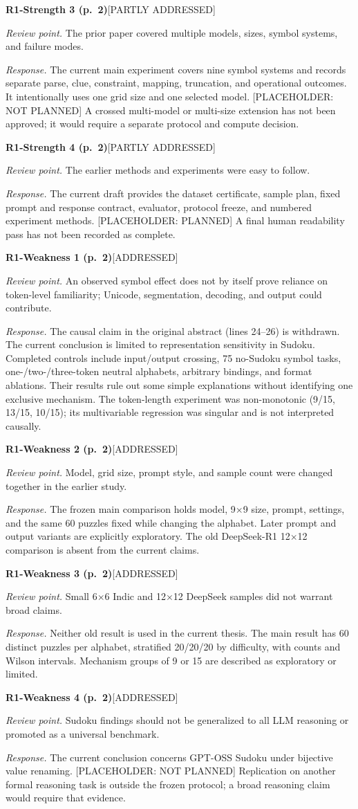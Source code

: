 \documentclass[10pt,a4paper]{article}
\newcommand{\Done}{\textcolor{done}{\textsf{[ADDRESSED]}}}
\newcommand{\Partial}{\textcolor{pending}{\textsf{[PARTLY ADDRESSED]}}}
\newcommand{\Planned}{\textcolor{pending}{\textsf{[PLACEHOLDER: PLANNED]}}}
\newcommand{\Open}{\textcolor{open}{\textsf{[PLACEHOLDER: NOT PLANNED]}}}
\newcommand{\itemresponse}[4]{%
  \Needspace{5\baselineskip}%
  \par\vspace{0.65\baselineskip}%
  \noindent\textbf{#1}\quad #2\par
  \noindent\emph{Review point.} #3\par
  \noindent\emph{Response.} #4\par
}
\begin{document}
\itemresponse{R1-Strength 3 (p.~2)}{\Partial}{The prior paper covered multiple models, sizes, symbol systems, and failure modes.}{The current main experiment covers nine symbol systems and records separate parse, clue, constraint, mapping, truncation, and operational outcomes. It intentionally uses one grid size and one selected model. \Open{} A crossed multi-model or multi-size extension has not been approved; it would require a separate protocol and compute decision.}

\itemresponse{R1-Strength 4 (p.~2)}{\Partial}{The earlier methods and experiments were easy to follow.}{The current draft provides the dataset certificate, sample plan, fixed prompt and response contract, evaluator, protocol freeze, and numbered experiment methods. \Planned{} A final human readability pass has not been recorded as complete.}

\itemresponse{R1-Weakness 1 (p.~2)}{\Done}{An observed symbol effect does not by itself prove reliance on token-level familiarity; Unicode, segmentation, decoding, and output could contribute.}{The causal claim in the original abstract (lines 24--26) is withdrawn. The current conclusion is limited to representation sensitivity in Sudoku. Completed controls include input/output crossing, 75 no-Sudoku symbol tasks, one-/two-/three-token neutral alphabets, arbitrary bindings, and format ablations. Their results rule out some simple explanations without identifying one exclusive mechanism. The token-length experiment was non-monotonic (9/15, 13/15, 10/15); its multivariable regression was singular and is not interpreted causally.}

\itemresponse{R1-Weakness 2 (p.~2)}{\Done}{Model, grid size, prompt style, and sample count were changed together in the earlier study.}{The frozen main comparison holds model, 9$\times$9 size, prompt, settings, and the same 60 puzzles fixed while changing the alphabet. Later prompt and output variants are explicitly exploratory. The old DeepSeek-R1 12$\times$12 comparison is absent from the current claims.}

\itemresponse{R1-Weakness 3 (p.~2)}{\Done}{Small 6$\times$6 Indic and 12$\times$12 DeepSeek samples did not warrant broad claims.}{Neither old result is used in the current thesis. The main result has 60 distinct puzzles per alphabet, stratified 20/20/20 by difficulty, with counts and Wilson intervals. Mechanism groups of 9 or 15 are described as exploratory or limited.}

\itemresponse{R1-Weakness 4 (p.~2)}{\Done}{Sudoku findings should not be generalized to all LLM reasoning or promoted as a universal benchmark.}{The current conclusion concerns GPT-OSS Sudoku under bijective value renaming. \Open{} Replication on another formal reasoning task is outside the frozen protocol; a broad reasoning claim would require that evidence.}
\end{document}
